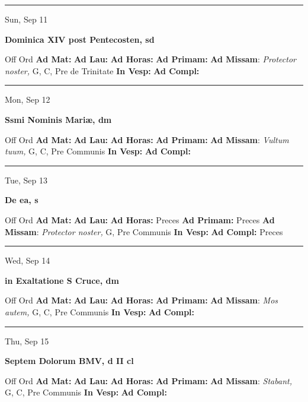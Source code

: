 \documentclass[letterpaper, 10pt]{article}
\begin{document}
\hrule
\begin{center}
Sun, Sep 11
\end{center}\textbf{ \large Dominica XIV post Pentecosten, \textnormal{\normalsize sd}}
\begin{justify}
Off Ord
\textbf{Ad Mat: }
\textbf{Ad Lau: }
\textbf{Ad Horas: }
\textbf{Ad Primam: }
\textbf{Ad Missam}: \textit{Protector noster,} G, C, Pre de Trinitate
\textbf{In Vesp: }
\textbf{Ad Compl: }\end{justify}



\hrule
\begin{center}
Mon, Sep 12
\end{center}\textbf{ \large Ssmi Nominis Mariæ, \textnormal{\normalsize dm}}
\begin{justify}
Off Ord
\textbf{Ad Mat: }
\textbf{Ad Lau: }
\textbf{Ad Horas: }
\textbf{Ad Primam: }
\textbf{Ad Missam}: \textit{Vultum tuum,} G, C, Pre Communis
\textbf{In Vesp: }
\textbf{Ad Compl: }\end{justify}



\hrule
\begin{center}
Tue, Sep 13
\end{center}\textbf{ \large De ea, \textnormal{\normalsize s}}
\begin{justify}
Off Ord
\textbf{Ad Mat: }
\textbf{Ad Lau: }
\textbf{Ad Horas: }Preces
\textbf{Ad Primam: }Preces
\textbf{Ad Missam}: \textit{Protector noster,} G, Pre Communis
\textbf{In Vesp: }
\textbf{Ad Compl: }Preces\end{justify}



\hrule
\begin{center}
Wed, Sep 14
\end{center}\textbf{ \large in Exaltatione S Cruce, \textnormal{\normalsize dm}}
\begin{justify}
Off Ord
\textbf{Ad Mat: }
\textbf{Ad Lau: }
\textbf{Ad Horas: }
\textbf{Ad Primam: }
\textbf{Ad Missam}: \textit{Mos autem,} G, C, Pre Communis
\textbf{In Vesp: }
\textbf{Ad Compl: }\end{justify}



\hrule
\begin{center}
Thu, Sep 15
\end{center}\textbf{ \large Septem Dolorum BMV, \textnormal{\normalsize d II cl}}
\begin{justify}
Off Ord
\textbf{Ad Mat: }
\textbf{Ad Lau: }
\textbf{Ad Horas: }
\textbf{Ad Primam: }
\textbf{Ad Missam}: \textit{Stabant,} G, C, Pre Communis
\textbf{In Vesp: }
\textbf{Ad Compl: }\end{justify}
\end{document}
